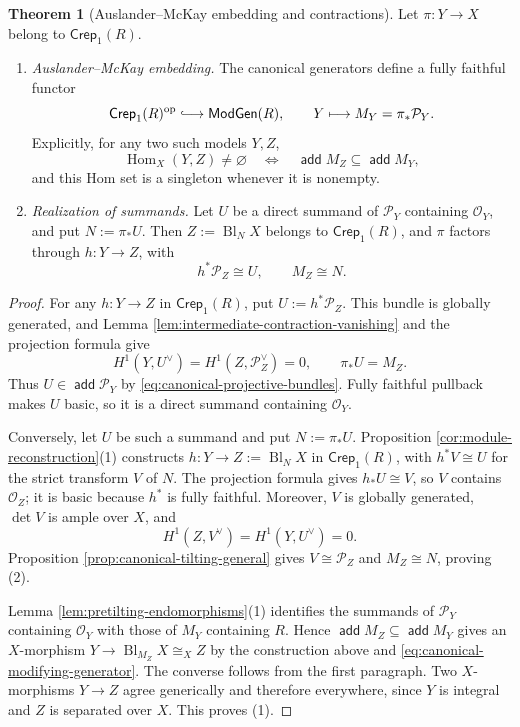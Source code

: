 \documentclass[a4paper,reqno]{amsart}
\def\O{\mathcal{O}}
\def\P{\mathcal{P}}
\DeclareMathOperator{\add}{\mathsf{add}}
\DeclareMathOperator{\Hom}{Hom}
\DeclareMathOperator{\op}{op}
\theoremstyle{definition}
\newtheorem{Thm}{Theorem}[section]
\begin{document}
\begin{Thm}[Auslander--McKay embedding and contractions]\label{thm:general-auslander-mckay-embedding}
Let $\pi\colon Y\to X$ belong to $\mathsf{Crep}_1(R)$.
\begin{enumerate}
\item \emph{Auslander--McKay embedding.}
The canonical generators define a fully faithful functor
\begin{equation}\label{eq:general-auslander-mckay-embedding}
\mathsf{Crep}_1(R)^{\op}\lhook\joinrel\longrightarrow\mathsf{ModGen}(R),
\qquad Y\longmapsto M_Y=\pi_*\P_Y.
\end{equation}
Explicitly, for any two such models $Y,Z$,
\begin{equation}\label{eq:general-model-morphisms}
\Hom_X(Y,Z)\ne\varnothing
\quad\Longleftrightarrow\quad
\add M_Z\subseteq\add M_Y,
\end{equation}
and this Hom set is a singleton whenever it is nonempty.

\item \emph{Realization of summands.}
Let $U$ be a direct summand of $\P_Y$ containing $\O_Y$, and put $N:=\pi_*U$. Then $Z:=\operatorname{Bl}_N X$ belongs to $\mathsf{Crep}_1(R)$, and $\pi$ factors through $h\colon Y\to Z$, with
\[
h^*\P_Z\cong U,\qquad M_Z\cong N.
\]
\end{enumerate}
\end{Thm}
\begin{proof}
For any $h\colon Y\to Z$ in $\mathsf{Crep}_1(R)$, put $U:=h^*\P_Z$. This bundle is globally generated, and Lemma \ref{lem:intermediate-contraction-vanishing} and the projection formula give
\[
H^1(Y,U^\vee)=H^1(Z,\P_Z^\vee)=0,
\qquad \pi_*U=M_Z.
\]
Thus $U\in\add\P_Y$ by \eqref{eq:canonical-projective-bundles}. Fully faithful pullback makes $U$ basic, so it is a direct summand containing $\O_Y$.

Conversely, let $U$ be such a summand and put $N:=\pi_*U$. Proposition \ref{cor:module-reconstruction}(1) constructs $h\colon Y\to Z:=\operatorname{Bl}_N X$ in $\mathsf{Crep}_1(R)$, with $h^*V\cong U$ for the strict transform $V$ of $N$. The projection formula gives $h_*U\cong V$, so $V$ contains $\O_Z$; it is basic because $h^*$ is fully faithful. Moreover, $V$ is globally generated, $\det V$ is ample over $X$, and
\[
H^1(Z,V^\vee)=H^1(Y,U^\vee)=0.
\]
Proposition \ref{prop:canonical-tilting-general} gives $V\cong\P_Z$ and $M_Z\cong N$, proving (2).

Lemma \ref{lem:pretilting-endomorphisms}(1) identifies the summands of $\P_Y$ containing $\O_Y$ with those of $M_Y$ containing $R$. Hence $\add M_Z\subseteq\add M_Y$ gives an $X$-morphism $Y\to\operatorname{Bl}_{M_Z}X\cong_X Z$ by the construction above and \eqref{eq:canonical-modifying-generator}. The converse follows from the first paragraph. Two $X$-morphisms $Y\to Z$ agree generically and therefore everywhere, since $Y$ is integral and $Z$ is separated over $X$. This proves (1).
\end{proof}
\end{document}
